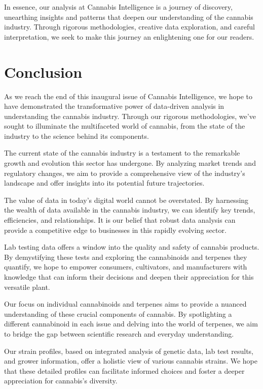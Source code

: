 \documentclass[../article.tex, 12pt]{subfiles}
\begin{document}
\begin{multicols*}{2}
In essence, our analysis at Cannabis Intelligence is a journey of discovery, unearthing insights and patterns that deepen our understanding of the cannabis industry. Through rigorous methodologies, creative data exploration, and careful interpretation, we seek to make this journey an enlightening one for our readers.


\section{Conclusion}
\label{sec:conclusion}

As we reach the end of this inaugural issue of Cannabis Intelligence, we hope to have demonstrated the transformative power of data-driven analysis in understanding the cannabis industry. Through our rigorous methodologies, we've sought to illuminate the multifaceted world of cannabis, from the state of the industry to the science behind its components.

The current state of the cannabis industry is a testament to the remarkable growth and evolution this sector has undergone. By analyzing market trends and regulatory changes, we aim to provide a comprehensive view of the industry's landscape and offer insights into its potential future trajectories.

The value of data in today's digital world cannot be overstated. By harnessing the wealth of data available in the cannabis industry, we can identify key trends, efficiencies, and relationships. It is our belief that robust data analysis can provide a competitive edge to businesses in this rapidly evolving sector.

Lab testing data offers a window into the quality and safety of cannabis products. By demystifying these tests and exploring the cannabinoids and terpenes they quantify, we hope to empower consumers, cultivators, and manufacturers with knowledge that can inform their decisions and deepen their appreciation for this versatile plant.

Our focus on individual cannabinoids and terpenes aims to provide a nuanced understanding of these crucial components of cannabis. By spotlighting a different cannabinoid in each issue and delving into the world of terpenes, we aim to bridge the gap between scientific research and everyday understanding.

Our strain profiles, based on integrated analysis of genetic data, lab test results, and grower information, offer a holistic view of various cannabis strains. We hope that these detailed profiles can facilitate informed choices and foster a deeper appreciation for cannabis's diversity.


\end{multicols*}
\end{document}
